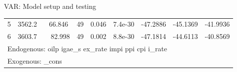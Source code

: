 \documentclass[usenames,dvipsnames]{beamer}
\begin{document}
\begin{frame}{VAR: Model setup and testing}
\begin{table}[]
{\begin{tabular}{ccccccccc}
5   & 3562.2~                  & 66.846                  & 49                      & 0.046                  & 7.4e-30                  & -47.2886                 & -45.1369                  & -41.9936                  \\ 
6   & 3603.7~                  & ~82.998                 & 49                      & 0.002                  & 8.8e-30                  & -47.1814                 & -44.6113                  & -40.8569                  \\ \hline
\multicolumn{9}{l}{Endogenous: oilp igae\_s ex\_rate impi ppi cpi i\_rate}                                                                                                                                             \\ \hline
\multicolumn{9}{l}{Exogenous: \_cons}                                                                                                                                                                                  \\ \hline
\end{tabular}}
\end{table}
\end{frame}
\end{document}
